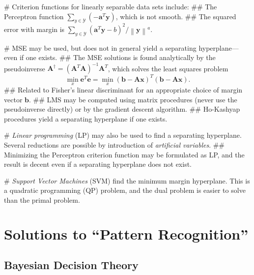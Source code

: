 \documentclass[12pt, a4paper]{article}
\newcommand{\Y}{\mathcal{Y}}
\newcommand{\vect}[1]{\bm{#1}}
\newcommand{\norm}[1]{\left\lVert#1\right\rVert}
\begin{document}
\begin{easylist}[itemize]
# Criterion functions for linearly separable data sets include:
## The Perceptron function $\sum_{y \in \Y} (-\vect{a}^T \vect{y})$, which is not smooth.
## The squared error with margin is $\sum_{y \in \Y} (\vect{a}^T \vect{y} - b)^2 / \norm{\vect{y}}^a$.

# MSE may be used, but does not in general yield a separating hyperplane---even if one exists.
## The MSE solutions is found analytically by the pseudoinverse $\vect{A}^\dagger = \left( \vect{A}^T \vect{A} \right)^{-1} \vect{A}^T$, which solves the least squares problem
\begin{equation*}
	\min_x \vect{e}^T\vect{e} = 
	\min_x \left(\vect{b} - \vect{A}\vect{x}\right)^T
	\left(\vect{b} - \vect{A}\vect{x}\right).
\end{equation*}
## Related to Fisher's linear discriminant for an appropriate choice of margin vector $\vect{b}$.
## LMS may be computed using matrix procedures (never use the pseudoinverse directly) or by the gradient descent algorithm.
## Ho-Kashyap procedures yield a separating hyperplane if one exists.

# \emph{Linear programming} (LP) may also be used to find a separating hyperplane. Several reductions are possible by introduction of \emph{artificial variables}.
## Minimizing the Perceptron criterion function may be formulated as LP, and the result is decent even if a separating hyperplane does not exist.

# \emph{Support Vector Machines} (SVM) find the minimum margin hyperplane.
This is a quadratic programming (QP) problem, and the dual problem is easier to solve than the primal problem.


\end{easylist}




\clearpage
\section{Solutions to ``Pattern Recognition''}

\setcounter{subsection}{1}
\subsection{Bayesian Decision Theory}
\end{document}
